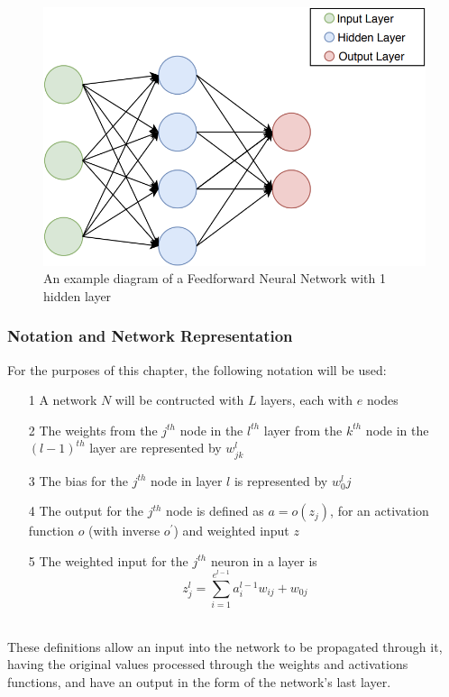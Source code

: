 \documentclass[a4paper,11pt,oneside]{article}
\theoremstyle{plain}
\theoremstyle{definition}
\begin{document}
\begin{figure}[H]
	\centering 
	\includegraphics[scale=0.5]{images/implementation/neural_network_diagram.png}
	\caption[Feedforward Neural Network Diagram]{An example diagram of a Feedforward Neural Network with 1 hidden layer}
	\label{figure-neural_network_diagram}
\end{figure}		

\subsubsection{Notation and Network Representation}\label{imp_ffn_functions}

For the purposes of this chapter, the following notation will be used:

\begin{itemize}
\item[1] A network $N$ will be contructed with $L$ layers, each with $e$ nodes
\item[2] The weights from the $j^{th}$ node in the $l^{th}$ layer from the $k^{th}$ node in the $(l-1)^{th}$ layer are represented by $w^l_{jk}$
\item[3] The bias for the $j^{th}$ node in layer $l$ is represented by $w^l_0j$
\item[4] The output for the $j^{th}$ node is defined as $a = o(z_j)$, for an activation function $o$ (with inverse $o^{\prime}$) and weighted input $z$
\item[5] The weighted input for the $j^{th}$ neuron in a layer is 
\begin{equation}\label{eq_weighted_input}
	z^l_j=\sum_{i=1}^{e^{l-1}}{a^{l-1}_iw_{ij}} + w_{0j}
\end{equation}
\end{itemize}
~\\
These definitions allow an input into the network to be propagated through it, having the original values processed through the weights and activations functions, and have an output in the form of the network's last layer.
\end{document}

